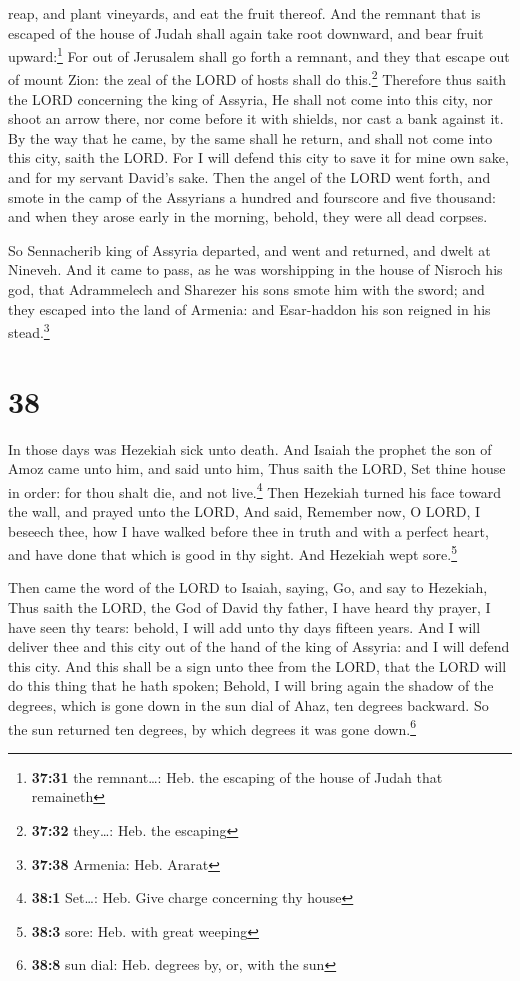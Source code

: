 reap, and plant vineyards, and eat the fruit thereof. 
And the remnant that is escaped of the house of Judah shall again take
root downward, and bear fruit upward:\footnote{\textbf{37:31} the
  remnant\ldots: Heb. the escaping of the house of Judah that remaineth}
 For out of Jerusalem shall go forth a remnant, and they
that escape out of mount Zion: the zeal of the LORD of hosts shall do
this.\footnote{\textbf{37:32} they\ldots: Heb. the escaping}
 Therefore thus saith the LORD concerning the king of
Assyria, He shall not come into this city, nor shoot an arrow there, nor
come before it with shields, nor cast a bank against it. 
By the way that he came, by the same shall he return, and shall not come
into this city, saith the LORD.  For I will defend this
city to save it for mine own sake, and for my servant David's sake.
 Then the angel of the LORD went forth, and smote in the
camp of the Assyrians a hundred and fourscore and five thousand: and
when they arose early in the morning, behold, they were all dead
corpses.

 So Sennacherib king of Assyria departed, and went and
returned, and dwelt at Nineveh.  And it came to pass, as
he was worshipping in the house of Nisroch his god, that Adrammelech and
Sharezer his sons smote him with the sword; and they escaped into the
land of Armenia: and Esar-haddon his son reigned in his
stead.\footnote{\textbf{37:38} Armenia: Heb. Ararat}

\hypertarget{section-37}{%
\section{38}\label{section-37}}

 In those days was Hezekiah sick unto death. And Isaiah
the prophet the son of Amoz came unto him, and said unto him, Thus saith
the LORD, Set thine house in order: for thou shalt die, and not
live.\footnote{\textbf{38:1} Set\ldots: Heb. Give charge concerning thy
  house}  Then Hezekiah turned his face toward the wall,
and prayed unto the LORD,  And said, Remember now, O LORD,
I beseech thee, how I have walked before thee in truth and with a
perfect heart, and have done that which is good in thy sight. And
Hezekiah wept sore.\footnote{\textbf{38:3} sore: Heb. with great weeping}

 Then came the word of the LORD to Isaiah, saying,
 Go, and say to Hezekiah, Thus saith the LORD, the God of
David thy father, I have heard thy prayer, I have seen thy tears:
behold, I will add unto thy days fifteen years.  And I
will deliver thee and this city out of the hand of the king of Assyria:
and I will defend this city.  And this shall be a sign
unto thee from the LORD, that the LORD will do this thing that he hath
spoken;  Behold, I will bring again the shadow of the
degrees, which is gone down in the sun dial of Ahaz, ten degrees
backward. So the sun returned ten degrees, by which degrees it was gone
down.\footnote{\textbf{38:8} sun dial: Heb. degrees by, or, with the sun}

